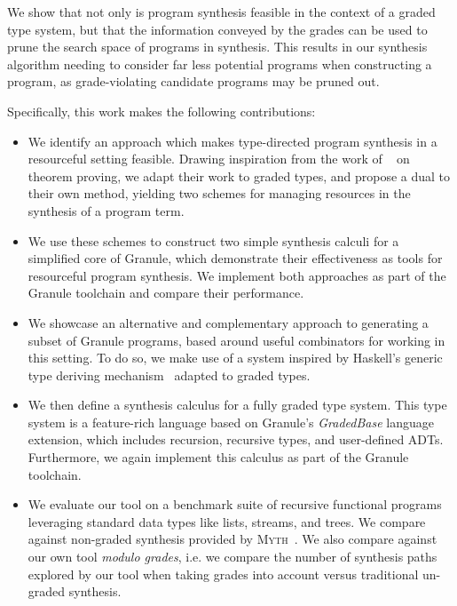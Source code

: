 We show that not only is program synthesis feasible in the context
of a graded type system, but that the information conveyed by the grades can be
used to prune the search space of programs in synthesis. This results in our
synthesis algorithm needing to consider far less potential programs when
constructing a program, as grade-violating candidate programs may be pruned out. 

Specifically, this work makes the following contributions:
\begin{itemize}
  \item We identify an approach which makes type-directed program synthesis in
        a resourceful setting feasible. Drawing inspiration from the work of
        ~\citet{HODAS1994327} on theorem proving, we adapt their
        work to graded types, and propose a dual to their own method, yielding two
        schemes for managing resources in the
        synthesis of a program term. 

  \item We use these schemes to construct two simple synthesis calculi for a
        simplified core of Granule, which demonstrate their effectiveness as
        tools for resourceful program synthesis. We implement both approaches as 
        part of the Granule toolchain and compare their performance.

  \item We showcase an alternative and complementary approach to generating a
        subset of Granule programs, based around useful combinators for working
        in this setting. To do so, we make use of a system inspired by Haskell's
        generic type deriving mechanism~\citep{generic-deriving} adapted to
        graded types.

  \item We then define a synthesis calculus for a fully graded type system. This
        type system is a feature-rich language based on Granule's
        \emph{GradedBase} language extension, which includes recursion,
        recursive types, and user-defined ADTs. Furthermore, we again implement
        this calculus as part of the Granule toolchain.

  \item We evaluate our tool on a benchmark suite of recursive functional
        programs leveraging standard data types like lists, streams, and trees.
        We compare against non-graded synthesis provided by
        \textsc{Myth}~\citep{oseraMYTH1}. We also compare against our own tool
        \emph{modulo grades}, i.e. we compare the number of synthesis paths
        explored by our tool when taking grades into account versus traditional
        un-graded synthesis.


\end{itemize}

